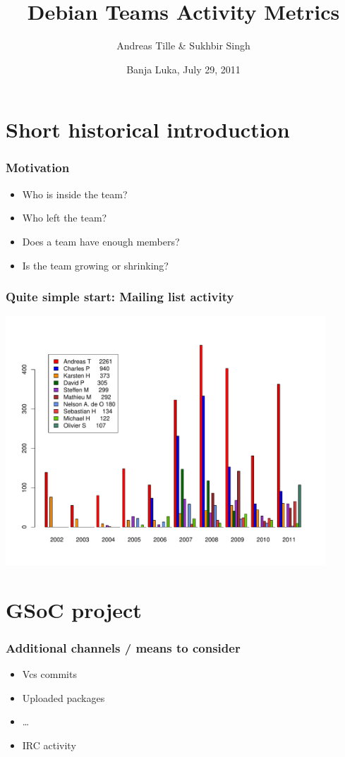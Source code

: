 \documentclass[compress]{beamer}
\title{Debian Teams Activity Metrics}
\author{Andreas Tille \& Sukhbir Singh}
\institute{\link{http://www.debconf.org/debconf11/}{DebConf 11}}
\date{Banja Luka, July 29, 2011}
\begin{document}
\begin{frame}
  \titlepage
\end{frame}

\section{Short historical introduction}

\begin{frame}
  \frametitle{Motivation}

  \begin{itemize}
     \item Who is inside the team?
     \item Who left the team?
     \item Does a team have enough members?
     \item Is the team growing or shrinking?
  \end{itemize}
\end{frame}

\begin{frame}
  \frametitle{Quite simple start: Mailing list activity}
      \begin{center}
        \includegraphics[width=0.9\textwidth]{authorstat_med}
      \end{center}

\end{frame}

\section{GSoC project}

\begin{frame}
  \frametitle{Additional channels / means %
              to consider
             }
  \begin{itemize}
    \item Vcs commits
    \item Uploaded packages
    \item \dots
    \item IRC activity %
  \end{itemize}
\end{frame}
\end{document}
